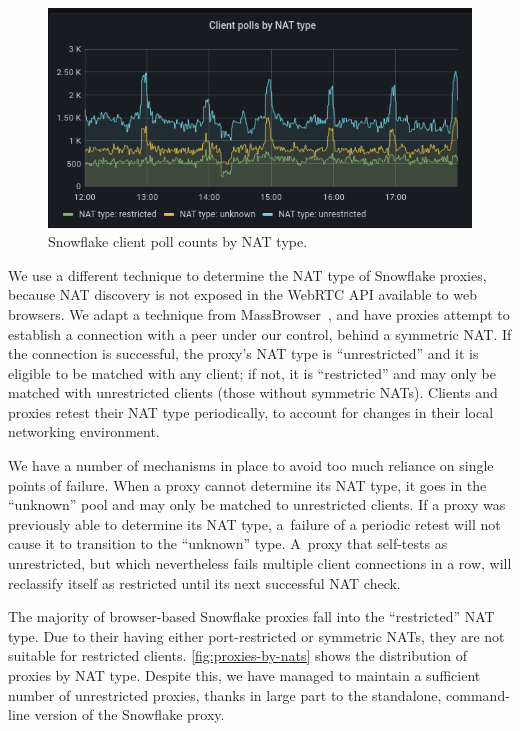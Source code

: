 \documentclass[letterpaper,twocolumn]{article}
\begin{document}
\begin{figure}
\centering
\includegraphics[width=\columnwidth]{figures/clients-by-nat}
\caption{Snowflake client poll counts by NAT type.}
\label{fig:clients-by-nat}
\end{figure}

We use a different technique to determine the NAT type of Snowflake proxies,
because NAT discovery is not exposed in the WebRTC API available to web browsers.
We adapt a technique from MassBrowser~\cite[\S \mbox{V-A}]{Nasr2020a},
and have proxies attempt to establish a connection with a peer under our control,
behind a symmetric NAT.
If the connection is successful,
the proxy's NAT type is ``unrestricted''
and it is eligible to be matched with any client;
if not, it is ``restricted''
and may only be matched with unrestricted clients
(those without symmetric NATs).
Clients and proxies
retest their NAT type periodically, to account for changes in their local networking
environment.

We have a number of
mechanisms in place to avoid too much reliance on single points of failure.
When a proxy cannot determine its NAT type,
it goes in the ``unknown'' pool and may only be matched to unrestricted clients.
If a proxy was previously able to determine its NAT type,
a~failure of a periodic retest will not cause it to transition to the ``unknown'' type.
A~proxy that self-tests as unrestricted,
but which nevertheless fails multiple client connections in a row,
will reclassify itself as restricted
until its next successful NAT check.

The majority of browser-based Snowflake proxies
fall into the ``restricted'' NAT type.
Due to their having either port-restricted or symmetric NATs,
they are not suitable for restricted clients.
\autoref{fig:proxies-by-nats} shows the distribution of proxies by NAT type.
Despite this, we have managed to maintain a sufficient number of unrestricted proxies,
thanks in large part to the standalone, command-line
version of the Snowflake proxy.
\end{document}
